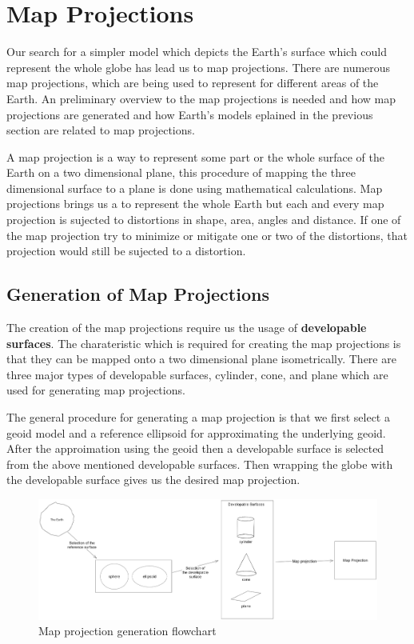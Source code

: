 
\clearpage
\cleardoublepage

\chapter{Map Projections}
Our search for a simpler model which depicts the Earth's surface which could represent the whole globe has lead us to map projections.
There are numerous map projections, which are being used to represent for different areas of the Earth. An preliminary overview to the map projections is needed and how map projections are generated and how Earth's models eplained in the previous section are related to map projections.

A map projection is a way to represent some part or the whole surface of the Earth on a two dimensional plane, this procedure of mapping the three dimensional surface to a plane is done using mathematical calculations.
Map projections brings us a to represent the whole Earth but each and every map projection is sujected to distortions in shape, area, angles and distance. If one of the map projection try to minimize or mitigate one or two of the distortions, that projection would still be sujected to a distortion.

\section{Generation of Map Projections}
The creation of the map projections require us the usage of \textbf{developable surfaces}. The charateristic which is required for creating the map projections is that they can be mapped onto a two dimensional plane isometrically\cite{Patrikalakis_Maekawa_2010}.
There are three major types of developable surfaces, cylinder, cone, and plane which are used for generating map projections.

The general procedure for generating a map projection is that we first select a geoid model and a reference ellipsoid for approximating the underlying geoid. After the approimation using the geoid then a developable surface is selected from the above mentioned developable surfaces.
Then wrapping the globe with the developable surface gives us the desired map projection.

\begin{figure}[h]
    \centering
    \includegraphics[width=1.0\textwidth]{figures/chapter-3/map_projection_creation.png}
    \caption{Map projection generation flowchart  }
    \label{fig:map_projection_creation}
\end{figure}
\newpage
